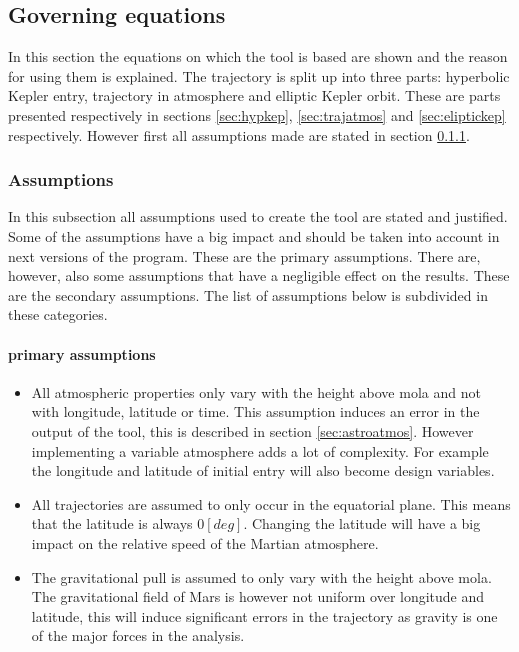 \subsection{Governing equations}
\label{sec:astrogov}
In this section the equations on which the tool is based are shown and the reason for using them is explained. The trajectory is split up into three parts: hyperbolic Kepler entry, trajectory in atmosphere and elliptic Kepler orbit. These are parts presented respectively in sections \ref{sec:hypkep}, \ref{sec:trajatmos} and \ref{sec:eliptickep} respectively. However first all assumptions made are stated in section \ref{sec:astroassumption}.

\subsubsection{Assumptions}
 \label{sec:astroassumption}
 In this subsection all assumptions used to create the tool are stated and justified. Some of the assumptions have a big impact and should be taken into account in next versions of the program. These are the primary assumptions. There are, however, also some assumptions that have a negligible effect on the results. These are the secondary assumptions. The list of assumptions below is subdivided in these categories.
 
 \paragraph{primary assumptions}
 \begin{itemize}
 \item All atmospheric properties only vary with the height above \gls{mola} and not with longitude, latitude or time. This assumption induces an error in the output of the tool, this is described in section \ref{sec:astroatmos}. However implementing a variable atmosphere adds a lot of complexity. For example the longitude and latitude of initial entry will also become design variables.
 \item All trajectories are assumed to only occur in the equatorial plane. This means that the latitude is always $0 \left[deg\right]$. Changing the latitude will have a big impact on the relative speed of the Martian atmosphere.
 \item The gravitational pull is assumed to only vary with the height above \gls{mola}. The gravitational field of Mars is however not uniform over longitude and latitude, this will induce significant errors in the trajectory as gravity is one of the major forces in the analysis.
 \end{itemize}

